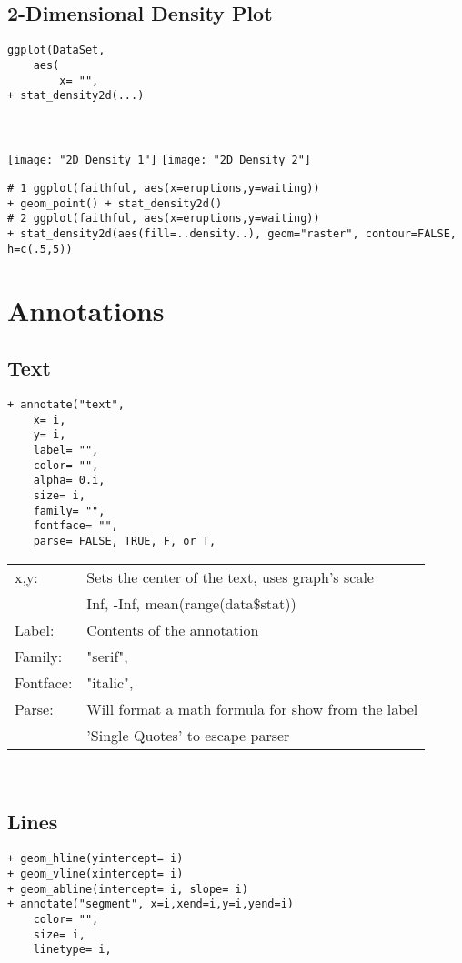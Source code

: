 \documentclass[]{article}
\begin{document}
\subsection{2-Dimensional Density Plot}
\begin{verbatim}
ggplot(DataSet,
	aes(
		x= "",
+ stat_density2d(...)
\end{verbatim}
\begin{tabular}{l l}
\end{tabular} \\
\texttt{[image: "2D Density 1"]}
\texttt{[image: "2D Density 2"]} \\
\begin{verbatim}
# 1 ggplot(faithful, aes(x=eruptions,y=waiting))
+ geom_point() + stat_density2d()
# 2 ggplot(faithful, aes(x=eruptions,y=waiting))
+ stat_density2d(aes(fill=..density..), geom="raster", contour=FALSE, h=c(.5,5))
\end{verbatim}

\section{Annotations}

\subsection{Text}
\begin{verbatim}
+ annotate("text",
	x= i,
	y= i, 
	label= "",
	color= "",
	alpha= 0.i,
	size= i,
	family= "",
	fontface= "",
	parse= FALSE, TRUE, F, or T,
\end{verbatim}
\begin{tabular}{l l}
	x,y: & Sets the center of the text, uses graph's scale \\
		& Inf, -Inf, mean(range(data\$stat)) \\
	Label: & Contents of the annotation \\
	Family: & "serif", \\
	Fontface: & "italic", \\
	Parse: & Will format a math formula for show from the label \\
		& 'Single Quotes' to escape parser \\
\end{tabular} \\

\subsection{Lines}
\begin{verbatim}
+ geom_hline(yintercept= i)
+ geom_vline(xintercept= i)
+ geom_abline(intercept= i, slope= i)
+ annotate("segment", x=i,xend=i,y=i,yend=i)
	color= "",
	size= i,
	linetype= i,
\end{verbatim}
\begin{tabular}{l l}
\end{tabular} \\
\end{document}
